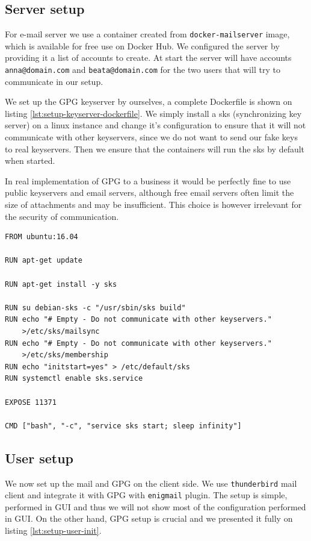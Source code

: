 \documentclass{classrep}
\newcommand\foreign[1]{#1}
\newcommand\code[1]{\texttt{#1}}
\begin{document}
\subsection{Server setup}

For e-mail server we use a container created from \code{docker-mailserver} image, which is
available for free use on Docker Hub. We configured the server by providing it a list of
accounts to create. At start the server will have accounts \code{anna@domain.com} and 
\code{beata@domain.com} for the two users that will try to communicate in our setup.

We set up the GPG keyserver by ourselves, a complete Dockerfile is shown on listing 
\ref{lst:setup-keyserver-dockerfile}. We simply install a sks 
(\foreign{synchronizing key server}) on a linux instance and change it's configuration
to ensure that it will not communicate with other keyservers, since we do not want
to send our fake keys to real keyservers. Then we ensure that the containers will
run the sks by default when started.

In real implementation of GPG to a business it would be perfectly fine to use public
keyservers and email servers, although free email servers often limit the size of
attachments and may be insufficient. This choice is however irrelevant for the security
of communication.

\begin{lstlisting}[label={lst:setup-keyserver-dockerfile}, caption={Dockerfile describing keyserver container.}]
FROM ubuntu:16.04

RUN apt-get update 

RUN apt-get install -y sks

RUN su debian-sks -c "/usr/sbin/sks build"
RUN echo "# Empty - Do not communicate with other keyservers." 
    >/etc/sks/mailsync
RUN echo "# Empty - Do not communicate with other keyservers." 
    >/etc/sks/membership
RUN echo "initstart=yes" > /etc/default/sks
RUN systemctl enable sks.service

EXPOSE 11371

CMD ["bash", "-c", "service sks start; sleep infinity"]
\end{lstlisting}

\subsection{User setup}

We now set up the mail and GPG on the client side. We use \code{thunderbird} mail client
and integrate it with GPG with \code{enigmail} plugin. The setup is simple, performed
in GUI and thus we will not show most of the configuration performed in GUI. On the other hand,
GPG setup is crucial and we presented it fully on listing \ref{lst:setup-user-init}.
\end{document}
